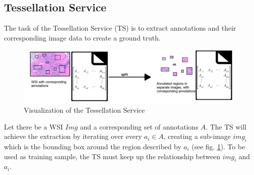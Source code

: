 \subsection{Tessellation Service}
\label{sec2_ts}
The task of the Tessellation Service (TS) is to extract annotations and their corresponding image data to create a ground truth.

\begin{figure}[H]
	\begin{center}
		\includegraphics[scale=0.25]{img/processChainC.png}
		\caption{Visualization of the Tessellation Service}
		\label{fig2_processChainC}
	\end{center}
\end{figure}

Let there be a WSI $Img$ and a corresponding set of annotations $A$. The TS will achieve the extraction by iterating over every $a_i \in A$, creating a sub-image $img_i$ which is the bounding box around the region described by $a_i$ (see fig. \ref{fig2_processChainC}). To be used as training sample, the TS must keep up the relationship between $img_i$ and $a_i$.